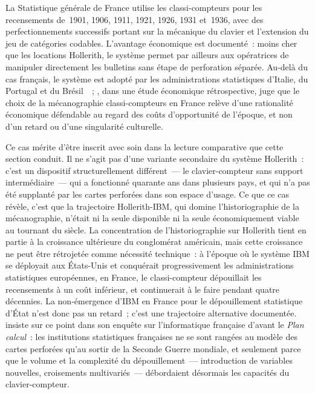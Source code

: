%
La Statistique générale de France utilise les classi-compteurs pour les recensements de~1901, 1906, 1911, 1921, 1926, 1931 et~1936, avec des perfectionnements successifs portant sur la mécanique du clavier et l'extension du jeu de catégories codables. L'avantage économique est documenté~: moins cher que les locations Hollerith, le système permet par ailleurs aux opératrices de manipuler directement les bulletins sans étape de perforation séparée. Au-delà du cas français, le système est adopté par les administrations statistiques d'Italie, du Portugal et du Brésil~\parencite[ch.~7]{gardey_ecrire_2008}~; \textcite{peaucelle_mecanographie_2004}, dans une étude économique rétrospective, juge que le choix de la mécanographie classi-compteurs en France relève d'une rationalité économique défendable au regard des coûts d'opportunité de l'époque, et non d'un retard ou d'une singularité culturelle.

Ce cas mérite d'être inscrit avec soin dans la lecture comparative que cette section conduit. Il ne s'agit pas d'une variante secondaire du système Hollerith~: c'est un dispositif structurellement différent~--- le clavier-compteur sans support intermédiaire~--- qui a fonctionné quarante ans dans plusieurs pays, et qui n'a pas été supplanté par les cartes perforées dans son espace d'usage. Ce que ce cas révèle, c'est que la trajectoire Hollerith-IBM, qui domine l'historiographie de la mécanographie, n'était ni la seule disponible ni la seule économiquement viable au tournant du siècle. La concentration de l'historiographie sur Hollerith tient en partie à la croissance ultérieure du conglomérat américain, mais cette croissance ne peut être rétrojetée comme nécessité technique~: à l'époque où le système IBM se déployait aux États-Unis et conquérait progressivement les administrations statistiques européennes, en France, le classi-compteur dépouillait les recensements à un coût inférieur, et continuerait à le faire pendant quatre décennies. La non-émergence d'IBM en France pour le dépouillement statistique d'État n'est donc pas un retard~; c'est une trajectoire alternative documentée. \textcite{mounier_kuhn_informatique_1999} insiste sur ce point dans son enquête sur l'informatique française d'avant le \emph{Plan calcul}~: les institutions statistiques françaises ne se sont rangées au modèle des cartes perforées qu'au sortir de la Seconde Guerre mondiale, et seulement parce que le volume et la complexité du dépouillement~--- introduction de variables nouvelles, croisements multivariés~--- débordaient désormais les capacités du clavier-compteur.


